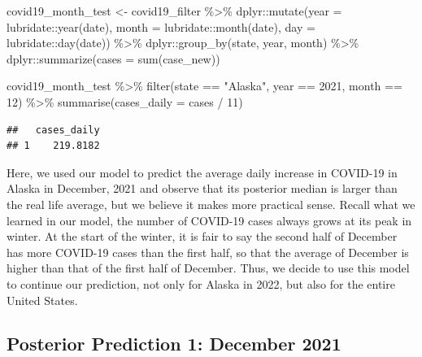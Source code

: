 \documentclass[
]{book}
\newenvironment{Shaded}{\begin{snugshade}}{\end{snugshade}}
\newcommand{\AttributeTok}[1]{\textcolor[rgb]{0.77,0.63,0.00}{#1}}
\newcommand{\DecValTok}[1]{\textcolor[rgb]{0.00,0.00,0.81}{#1}}
\newcommand{\FunctionTok}[1]{\textcolor[rgb]{0.00,0.00,0.00}{#1}}
\newcommand{\NormalTok}[1]{#1}
\newcommand{\OtherTok}[1]{\textcolor[rgb]{0.56,0.35,0.01}{#1}}
\newcommand{\SpecialCharTok}[1]{\textcolor[rgb]{0.00,0.00,0.00}{#1}}
\newcommand{\StringTok}[1]{\textcolor[rgb]{0.31,0.60,0.02}{#1}}
\begin{document}
\begin{Shaded}
\begin{Highlighting}[]
\NormalTok{covid19\_month\_test }\OtherTok{\textless{}{-}}\NormalTok{ covid19\_filter }\SpecialCharTok{\%\textgreater{}\%}
\NormalTok{  dplyr}\SpecialCharTok{::}\FunctionTok{mutate}\NormalTok{(}\AttributeTok{year =}\NormalTok{ lubridate}\SpecialCharTok{::}\FunctionTok{year}\NormalTok{(date), }
                \AttributeTok{month =}\NormalTok{ lubridate}\SpecialCharTok{::}\FunctionTok{month}\NormalTok{(date), }
                \AttributeTok{day =}\NormalTok{ lubridate}\SpecialCharTok{::}\FunctionTok{day}\NormalTok{(date)) }\SpecialCharTok{\%\textgreater{}\%}
\NormalTok{  dplyr}\SpecialCharTok{::}\FunctionTok{group\_by}\NormalTok{(state, year, month) }\SpecialCharTok{\%\textgreater{}\%}
\NormalTok{  dplyr}\SpecialCharTok{::}\FunctionTok{summarize}\NormalTok{(}\AttributeTok{cases =} \FunctionTok{sum}\NormalTok{(case\_new)) }

\NormalTok{covid19\_month\_test }\SpecialCharTok{\%\textgreater{}\%} 
  \FunctionTok{filter}\NormalTok{(state }\SpecialCharTok{==} \StringTok{"Alaska"}\NormalTok{, year }\SpecialCharTok{==} \DecValTok{2021}\NormalTok{, month }\SpecialCharTok{==} \DecValTok{12}\NormalTok{) }\SpecialCharTok{\%\textgreater{}\%}
  \FunctionTok{summarise}\NormalTok{(}\AttributeTok{cases\_daily =}\NormalTok{ cases }\SpecialCharTok{/} \DecValTok{11}\NormalTok{)}
\end{Highlighting}
\end{Shaded}

\begin{verbatim}
##   cases_daily
## 1    219.8182
\end{verbatim}

Here, we used our model to predict the average daily increase in COVID-19 in Alaska in December, 2021 and observe that its posterior median is larger than the real life average, but we believe it makes more practical sense. Recall what we learned in our model, the number of COVID-19 cases always grows at its peak in winter. At the start of the winter, it is fair to say the second half of December has more COVID-19 cases than the first half, so that the average of December is higher than that of the first half of December. Thus, we decide to use this model to continue our prediction, not only for Alaska in 2022, but also for the entire United States.

\hypertarget{posterior-prediction-1-december-2021-1}{%
\subsection{Posterior Prediction 1: December 2021}\label{posterior-prediction-1-december-2021-1}}
\end{document}
